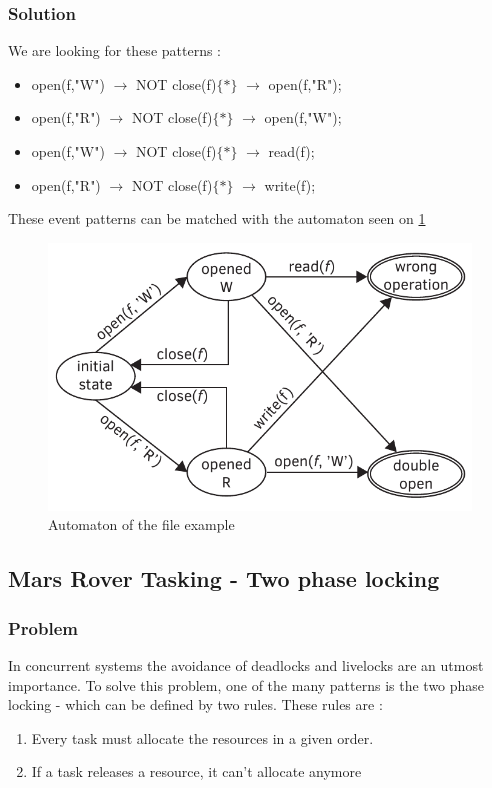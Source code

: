 			\subsubsection{Solution}
				We are looking for these patterns :

				\begin{itemize}
					\item open(f,"W") $\rightarrow$ NOT close(f)$\{\ast\}$ $\rightarrow$ open(f,"R");
					\item open(f,"R") $\rightarrow$ NOT close(f)$\{\ast\}$ $\rightarrow$ open(f,"W");
					\item open(f,"W") $\rightarrow$ NOT close(f)$\{\ast\}$ $\rightarrow$ read(f);
					\item open(f,"R") $\rightarrow$ NOT close(f)$\{\ast\}$ $\rightarrow$ write(f);
				\end{itemize}

				These event patterns can be matched with the automaton seen on \cref{fig:cep:fileautomaton}
				
				\begin{figure}[h]
				\centering
				\includegraphics[width=0.7\linewidth]{include/figures/chapter_5/file_example_aut}
				\caption{Automaton of the file example}
				\label{fig:cep:fileautomaton}
				\end{figure}

		
		
		\subsection{Mars Rover Tasking - Two phase locking}
			\subsubsection{Problem}
				In concurrent systems the avoidance of deadlocks and livelocks are an utmost importance.
				To solve this problem, one of the many patterns is  the two phase locking - which can be defined by two rules.
				These rules are : 
				\begin{enumerate}
					\item \label{itm:cep:mp1} Every task must allocate the resources in a given order.
					\item \label{itm:cep:mp2} If a task releases a resource, it can't allocate anymore
				\end{enumerate}
